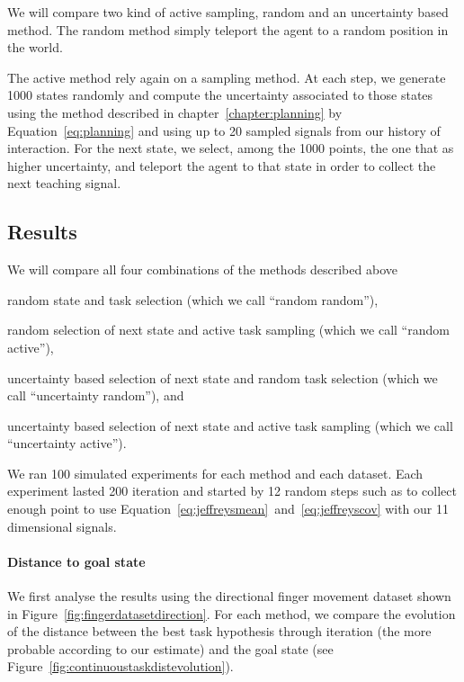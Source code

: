 We will compare two kind of active sampling, random and an uncertainty based method. The random method simply teleport the agent to a random position in the world. 

The active method rely again on a sampling method. At each step, we generate 1000 states randomly and compute the uncertainty associated to those states using the method described in chapter~\ref{chapter:planning} by Equation~\ref{eq:planning} and using up to 20 sampled signals from our history of interaction. For the next state, we select, among the 1000 points, the one that as higher uncertainty, and teleport the agent to that state in order to collect the next teaching signal.

\subsection{Results}

We will compare all four combinations of the methods described above \begin{inparaenum}[a)] \item random state and task selection (which we call ``random random''), \item random selection of next state and active task sampling (which we call ``random active''), \item uncertainty based selection of next state and random task selection (which we call ``uncertainty random''), and \item uncertainty based selection of next state and active task sampling (which we call ``uncertainty active''). \end{inparaenum}

We ran 100 simulated experiments for each method and each dataset. Each experiment lasted 200 iteration and started by 12 random steps such as to collect enough point to use Equation~\ref{eq:jeffreysmean}~and~\ref{eq:jeffreyscov} with our 11 dimensional signals.

\paragraph{Distance to goal state}

We first analyse the results using the directional finger movement dataset shown in Figure~\ref{fig:fingerdatasetdirection}. For each method, we compare the evolution of the distance between the best task hypothesis through iteration (the more probable according to our estimate) and the goal state (see Figure~\ref{fig:continuoustaskdistevolution}).


